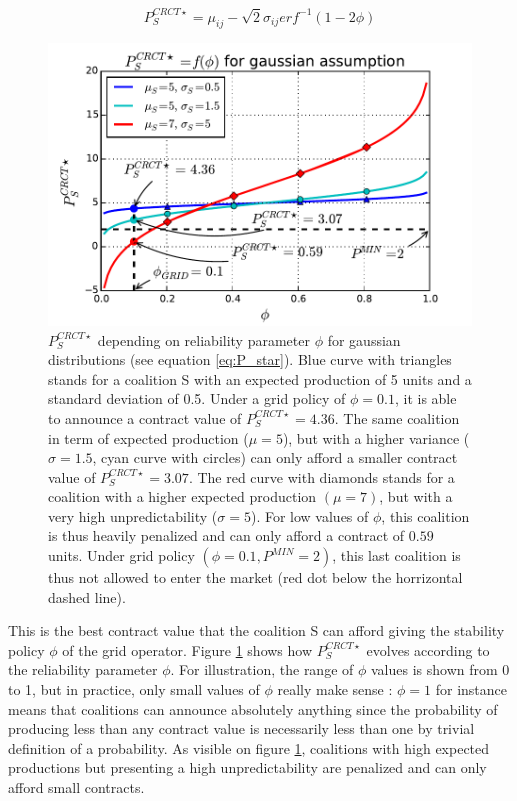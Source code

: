 \documentclass[conference]{IEEEtran}
\begin{document}
\begin{equation}
\label{eq:P_star}
P_{S}^{CRCT \star} = \mu_{ij} - \sqrt{2} \sigma_{ij} erf^{-1}( 1 - 2 \phi )
\end{equation}

\begin{figure}
\includegraphics[scale=.6]{gaussian_P_star}
\caption{$ P_{S}^{CRCT \star} $ depending on reliability parameter $ \phi $ for gaussian distributions (see equation \ref{eq:P_star}). Blue curve with triangles stands for a coalition S with an expected production of 5 units and a standard deviation of 0.5. Under a grid policy of $ \phi = 0.1 $, it is able to announce a contract value of $ P_{S}^{CRCT \star} = 4.36 $. The same coalition in term of expected production ($\mu = 5 $), but with a higher variance ($ \sigma = 1.5 $, cyan curve with circles) can only afford a smaller contract value of $ P_{S}^{CRCT \star} = 3.07 $. The red curve with diamonds stands for a coalition with a higher expected production $(\mu = 7)$, but with a very high unpredictability ($ \sigma = 5 $). For low values of $ \phi $, this coalition is thus heavily penalized and can only afford a contract of $ 0.59 $ units. Under grid policy $ (\phi = 0.1, P^{MIN} = 2) $, this last coalition is thus not allowed to enter the market (red dot below the horrizontal dashed line). }
\label{fig:Gaussian}
\end{figure}

This is the best contract value that the coalition S can afford giving the stability policy $\phi$ of the grid operator. Figure \ref{fig:Gaussian} shows how $ P_{S}^{CRCT \star} $ evolves according to the reliability parameter $ \phi $. For illustration, the range of $ \phi $ values is shown from 0 to 1, but in practice, only small values of $ \phi $ really make sense : $ \phi = 1 $ for instance means that coalitions can announce absolutely anything since the probability of producing less than any contract value is necessarily less than one by trivial definition of a probability. As visible on figure \ref{fig:Gaussian}, coalitions with high expected productions but presenting a high unpredictability are penalized and can only afford small contracts.  
\end{document}
